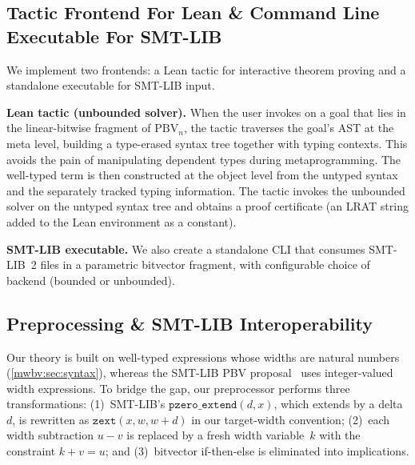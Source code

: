 \subsection{Tactic Frontend For Lean \& Command Line Executable For SMT-LIB}

We implement two frontends: a Lean tactic for interactive theorem proving
and a standalone executable for SMT-LIB input.

\noindent\textbf{Lean tactic (unbounded solver).}
When the user invokes \ourtactic{} on a goal that lies in the linear-bitwise
fragment of $\text{PBV}_n$, the tactic traverses the goal's AST at the meta
level, building a type-erased syntax tree together with typing contexts. This
avoids the pain of manipulating dependent types during metaprogramming. The
well-typed term is then constructed at the object level from the untyped syntax
and the separately tracked typing information. The tactic invokes the unbounded
solver on the untyped syntax tree and obtains a proof certificate (an LRAT
string added to the Lean environment as a constant).

\noindent\textbf{SMT-LIB executable.}
We also create a standalone CLI that consumes SMT-LIB~2 files
in a parametric bitvector fragment, with configurable choice of backend (bounded or unbounded).

\subsection{Preprocessing \& SMT-LIB Interoperability}

Our theory is built on well-typed expressions whose widths are natural numbers
(\cref{mwbv:sec:syntax}), whereas the SMT-LIB PBV
proposal~\cite{bit-precise-parametric-bv} uses integer-valued width expressions.
To bridge the gap, our preprocessor performs three transformations:
(1)~SMT-LIB's $\texttt{pzero\_extend}(d, x)$, which extends by a delta~$d$,
is rewritten as $\texttt{zext}(x, w, w+d)$ in our target-width convention;
(2)~each width subtraction $u - v$ is replaced by a fresh width variable~$k$
with the constraint $k + v = u$; and
(3)~bitvector if-then-else is eliminated into implications.

